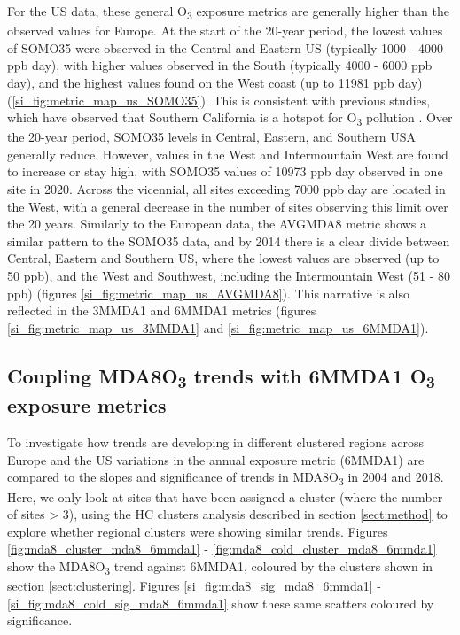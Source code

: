 \documentclass[journal abbreviation, manuscript]{copernicus}
\begin{document}
For the US data, these general O\textsubscript{3} exposure metrics are generally higher than the observed values for Europe. At the start of the 20-year period, the lowest values of SOMO35 were observed in the Central and Eastern US (typically 1000 - 4000 ppb day), with higher values observed in the South (typically 4000 - 6000 ppb day), and the highest values found on the West coast (up to 11981 ppb day) (\ref{si_fig:metric_map_us_SOMO35}). This is consistent with previous studies, which have observed that Southern California is a hotspot for O\textsubscript{3} pollution \citep{fleming_2018, WangKeding2024}. Over the 20-year period, SOMO35 levels in Central, Eastern, and Southern USA generally reduce. However, values in the West and Intermountain West are found to increase or stay high, with SOMO35 values of 10973 ppb day observed in one site in 2020. Across the vicennial, all sites exceeding 7000 ppb day are located in the West, with a general decrease in the number of sites observing this limit over the 20 years. Similarly to the European data, the AVGMDA8 metric shows a similar pattern to the SOMO35 data, and by 2014 there is a clear divide between Central, Eastern and Southern US, where the lowest values are observed (up to 50 ppb), and the West and Southwest, including the Intermountain West (51 - 80 ppb) (figures \ref{si_fig:metric_map_us_AVGMDA8}). This narrative is also reflected in the 3MMDA1 and 6MMDA1 metrics (figures \ref{si_fig:metric_map_us_3MMDA1} and \ref{si_fig:metric_map_us_6MMDA1}).

\subsection{Coupling MDA8O\textsubscript{3} trends with 6MMDA1 O\textsubscript{3} exposure metrics} \label{sect:polluted_stuff}

To investigate how trends are developing in different clustered regions across Europe and the US variations in the annual exposure metric (6MMDA1) are compared to the slopes and significance of trends in MDA8O\textsubscript{3} in 2004 and 2018. Here, we only look at sites that have been assigned a cluster (where the number of sites > 3), using the HC clusters analysis described in section \ref{sect:method} to explore whether regional clusters were showing similar trends. Figures \ref{fig:mda8_cluster_mda8_6mmda1} - \ref{fig:mda8_cold_cluster_mda8_6mmda1} show the MDA8O\textsubscript{3} trend against 6MMDA1, coloured by the clusters shown in section \ref{sect:clustering}. Figures \ref{si_fig:mda8_sig_mda8_6mmda1} - \ref{si_fig:mda8_cold_sig_mda8_6mmda1} show these same scatters coloured by significance.
\end{document}
